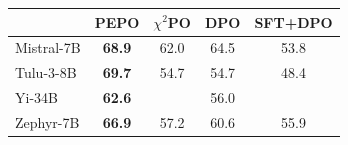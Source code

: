\small
\begin{tabular}{lcccc}
\toprule
 & PEPO & $\chi^2$PO & DPO & SFT+DPO \\
\midrule
Mistral-7B & \textbf{68.9} & 62.0 & 64.5 & 53.8 \\
Tulu-3-8B & \textbf{69.7} & 54.7 & 54.7 & 48.4 \\
Yi-34B & \textbf{62.6} &  & 56.0 &  \\
Zephyr-7B & \textbf{66.9} & 57.2 & 60.6 & 55.9 \\
\bottomrule
\end{tabular}
